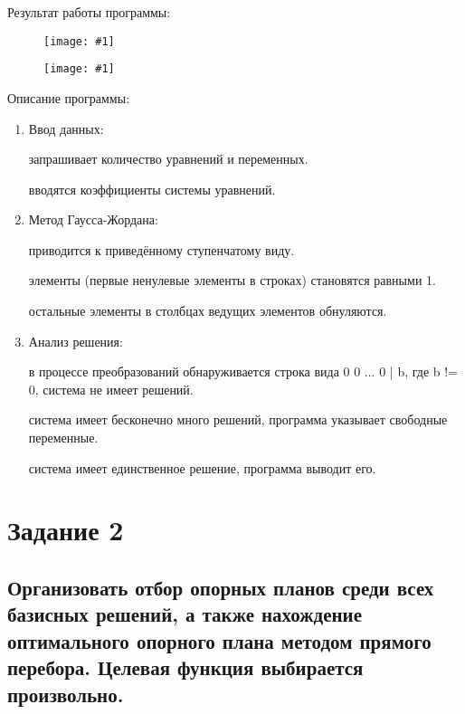 \documentclass{report}
\newcommand{\drawzalupa}[2]{
	\begin{figure}[H]
		\centering
		\texttt{[image: \#1]}
	\end{figure}
}
\begin{document}
	\newpage
	
	Результат работы программы:
	
	\drawzalupa{images/task1.png}{0.9}
	
	\drawzalupa{images/task12.png}{0.75}
	
	\newpage
	
	Описание программы:
	\begin{enumerate}
		\item{Ввод данных:}
		
		\begin{itemize}
			 запрашивает количество уравнений и переменных.
			
			 вводятся коэффициенты системы уравнений.
		\end{itemize}
		
		\item{Метод Гаусса-Жордана:}
		
		\begin{itemize}
			 приводится к приведённому ступенчатому виду.
			
			 элементы (первые ненулевые элементы в строках) становятся равными 1.
			
			 остальные элементы в столбцах ведущих элементов обнуляются.
		\end{itemize}
		
		\item{Анализ решения:}
		
		\begin{itemize}
			 в процессе преобразований обнаруживается строка вида 0 0 ... 0 | b, где b != 0, система не имеет решений.
			
			 система имеет бесконечно много решений, программа указывает свободные переменные.
			
			 система имеет единственное решение, программа выводит его.
		\end{itemize}
		
	\end{enumerate}
	\chapter{Задание 2}
	\section{Организовать отбор опорных планов среди всех базисных решений,
		а также нахождение оптимального опорного плана методом
		прямого перебора. Целевая функция выбирается произвольно.}
	
\end{document}
